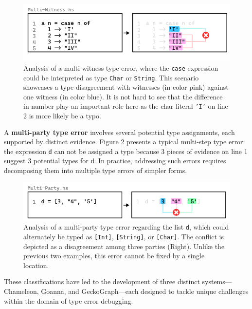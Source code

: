 \begin{figure}[hbt]
  \includegraphics[width=\linewidth]{Multi-Witness}
  \caption{
    \label{fig:multi-witness-example}
    Analysis of a multi-witness type error, where the \texttt{case} expression could be interpreted as type \texttt{Char} or \texttt{String}. This scenario showcases a type disagreement with witnesses (in color pink) against one witness (in color blue). It is not hard to see that the difference in number play an important role here as the char literal \texttt{'I'} on line 2 is more likely be a typo.
    }
\end{figure}

A \textbf{multi-party type error} involves several potential type assignments, each supported by distinct evidence.  Figure \ref{fig:multi-party-example} presents a typical multi-step type error: the expression \texttt{d} can not be assigned a type because 3 pieces of evidence on line 1 suggest 3 potential types for \texttt{d}. In practice, addressing such errors requires decomposing them into multiple type errors of simpler forms.


\begin{figure}[hbt]
  \includegraphics[width=\linewidth]{Multi-Party}
  \caption{
    \label{fig:multi-party-example}
    Analysis of a multi-party type error regarding the list \texttt{d}, which could alternately be typed as \texttt{[Int]}, \texttt{[String]}, or \texttt{[Char]}. The conflict is depicted as a disagreement among three parties (Right). Unlike the previous two examples, this error cannot be fixed by a single location. }
\end{figure}

These classifications have led to the development of three distinct systems—Chameleon, Goanna, and GeckoGraph—each designed to tackle unique challenges within the domain of type error debugging.

